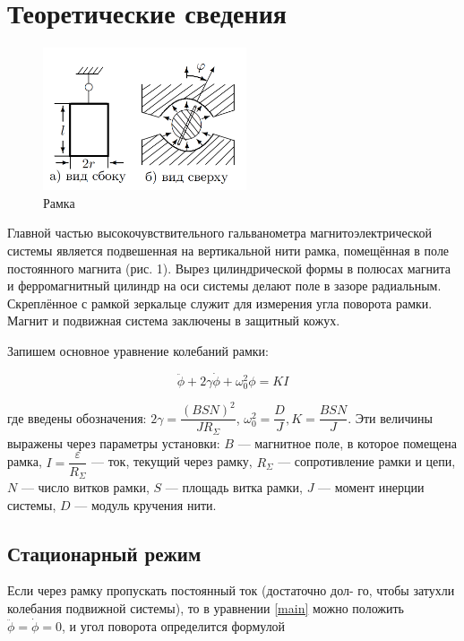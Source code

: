 \documentclass[a4paper,12pt]{article}
\begin{document}
\section{Теоретические сведения}

\begin{figure} 
    \includegraphics[width=6cm]{ramka}
    \caption{Рамка}
    \label{}
\end{figure}

Главной частью высокочувствительного гальванометра магнитоэлектрической системы является подвешенная на вертикальной нити рамка, помещённая в поле постоянного магнита (рис. 1). Вырез цилиндрической формы в полюсах магнита и ферромагнитный цилиндр на оси системы делают поле в зазоре радиальным. Скреплённое с рамкой зеркальце служит для измерения угла поворота рамки. Магнит и подвижная система заключены в защитный кожух.

Запишем основное уравнение колебаний рамки:

\begin{equation}\label{main}
\ddot{\phi} + 2\gamma\dot{\phi }+ \omega_0^2\phi = K I
\end{equation}
	
где введены обозначения: $ 2\gamma = \dfrac{(BSN)^2}{JR_\Sigma} $, $ \omega_0^2 = \dfrac{D}{J}, K = \dfrac{BSN}{J} $. Эти величины выражены через параметры установки: $ B $ --- магнитное поле, в которое помещена рамка, $ I  = \dfrac{\varepsilon}{R_\Sigma}$ --- ток, текущий через рамку, $ R_\Sigma $ --- сопротивление рамки и цепи, $ N $ --- число витков рамки, $ S $ --- площадь витка рамки, $ J $ --- момент инерции системы, $ D $ --- модуль кручения нити.

\subsection{Стационарный режим}
Если через рамку пропускать постоянный ток (достаточно дол-
го, чтобы затухли колебания подвижной системы), то в уравнении \eqref{main} можно положить $ \ddot{\phi} = \dot{\phi } = 0 $, и угол поворота определится формулой
\end{document}

